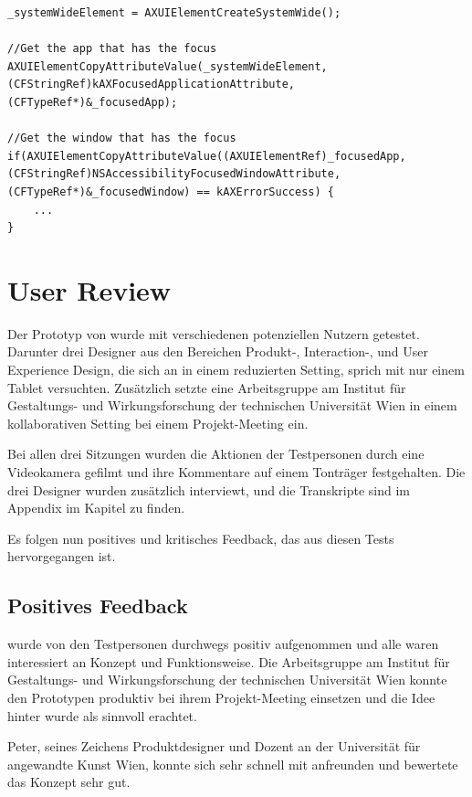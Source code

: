 \begin{lstlisting}[float,caption=Laden von Accessibility Daten,label=lst:accessiblityDaten]
_systemWideElement = AXUIElementCreateSystemWide();
	
//Get the app that has the focus
AXUIElementCopyAttributeValue(_systemWideElement, (CFStringRef)kAXFocusedApplicationAttribute, (CFTypeRef*)&_focusedApp);

//Get the window that has the focus
if(AXUIElementCopyAttributeValue((AXUIElementRef)_focusedApp, (CFStringRef)NSAccessibilityFocusedWindowAttribute, (CFTypeRef*)&_focusedWindow) == kAXErrorSuccess) {
    ...
}		
\end{lstlisting}

\section{User Review} \label{sec:userReview} 
Der Prototyp von \scribbler wurde mit verschiedenen potenziellen Nutzern getestet. Darunter drei Designer aus den Bereichen Produkt-, Interaction-, und User Experience Design, die sich an \scribbler in einem reduzierten Setting, sprich mit nur einem Tablet versuchten. Zusätzlich setzte eine Arbeitsgruppe am Institut für Gestaltungs- und Wirkungsforschung der technischen Universität Wien \scribbler in einem kollaborativen Setting bei einem Projekt-Meeting ein. 

Bei allen drei Sitzungen wurden die Aktionen der Testpersonen durch eine Videokamera gefilmt und ihre Kommentare auf einem Tonträger festgehalten. Die drei Designer wurden zusätzlich interviewt, und die Transkripte sind im Appendix im Kapitel  zu finden.

Es folgen nun positives und kritisches Feedback, das aus diesen Tests hervorgegangen ist.

\subsection{Positives Feedback}

\scribbler wurde von den Testpersonen durchwegs positiv aufgenommen und alle waren interessiert an Konzept und Funktionsweise. Die Arbeitsgruppe am Institut für Gestaltungs- und Wirkungsforschung der technischen Universität Wien konnte den Prototypen produktiv bei ihrem Projekt-Meeting einsetzen und die Idee hinter \scribbler wurde als sinnvoll erachtet. 

Peter, seines Zeichens Produktdesigner und Dozent an der Universität für angewandte Kunst Wien, konnte sich sehr schnell mit \scribbler anfreunden und bewertete das Konzept sehr gut.

